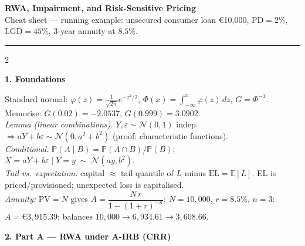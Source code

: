 \documentclass[10pt,a4paper]{report}
\renewcommand{\EUR}[1]{\euro#1}
\newcommand{\PD}{\mathrm{PD}}
\newcommand{\LGD}{\mathrm{LGD}}
\newcommand{\EL}{\mathrm{EL}}
\newcommand{\PV}{\mathrm{PV}}
\newcommand{\sect}[1]{\vspace{1.2mm}\textcolor{ceruleanlink}{\textbf{#1}}\par\vspace{0.3mm}}
\begin{document}
\begin{center}
{\LARGE\bfseries RWA, Impairment, and Risk-Sensitive Pricing}\\[1mm]
{\small Cheat sheet --- running example: unsecured consumer loan
\EUR{10{,}000}, $\PD=2\%$, $\LGD=45\%$, 3-year annuity at $8.5\%$.}
\end{center}
\vspace{-2mm}
\hrule
\vspace{1mm}

\begin{multicols}{2}

\sect{1. Foundations}

Standard normal: $\varphi(z)=\frac{1}{\sqrt{2\pi}}e^{-z^{2}/2}$,\;
$\Phi(x)=\int_{-\infty}^{x}\varphi(z)\,dz$,\; $G=\Phi^{-1}$.\\
Memorise: $G(0.02)=-2.0537$, $G(0.999)=3.0902$.\\
\emph{Lemma (linear combinations).} $Y,\varepsilon\sim\mathcal N(0,1)$
indep.\ $\Rightarrow aY+b\varepsilon\sim\mathcal N(0,a^{2}+b^{2})$
(proof: characteristic functions).\\
\emph{Conditional.} $\mathbb P(A\mid B)=\mathbb P(A\cap B)/\mathbb P(B)$;\;
$X=aY+b\varepsilon \mid Y=y \;\sim\; \mathcal N(ay,b^{2})$.\\
\emph{Tail vs.\ expectation:} capital $\approx$ tail quantile of $L$
minus $\EL=\mathbb E[L]$. EL is priced/provisioned; unexpected loss
is capitalised.\\
\emph{Annuity:} $\PV=N$ gives
$A=\dfrac{N\,r}{1-(1+r)^{-n}}$;\;
$N=10{,}000$, $r=8.5\%$, $n=3$: $A=\EUR{3{,}915.39}$;
balances $10{,}000\to 6{,}934.61\to 3{,}608.66$.

\sect{2. Part A --- RWA under A-IRB (CRR)}


\end{multicols}
\end{document}
